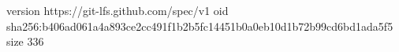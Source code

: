 version https://git-lfs.github.com/spec/v1
oid sha256:b406ad061a4a893ce2cc491f1b2b5fc14451b0a0eb10d1b72b99cd6bd1ada5f5
size 336
